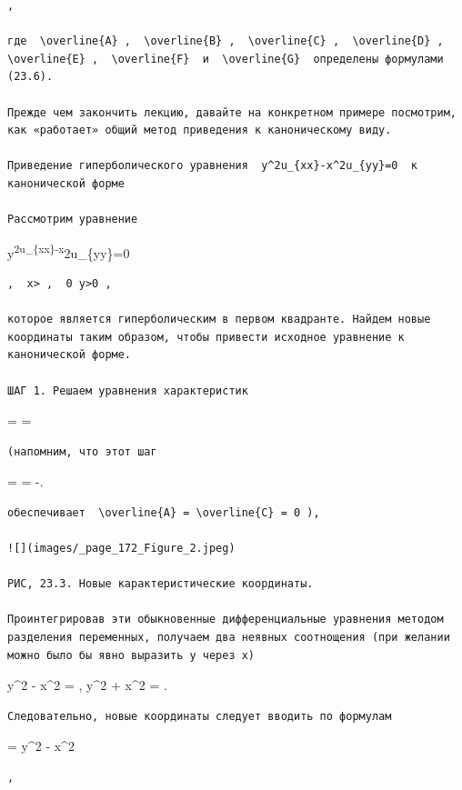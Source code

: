 \documentclass[
  ukrainian,
]{article}
\begin{document}
\begin{verbatim}
,

где  \overline{A} ,  \overline{B} ,  \overline{C} ,  \overline{D} ,  \overline{E} ,  \overline{F}  и  \overline{G}  определены формулами (23.6).

Прежде чем закончить лекцию, давайте на конкретном примере посмотрим, как «работает» общий метод приведения к каноническому виду.

Приведение гиперболического уравнения  y^2u_{xx}-x^2u_{yy}=0  к канонической форме

Рассмотрим уравнение
\end{verbatim}

y\textsuperscript{2u\_\{xx\}-x}2u\_\{yy\}=0

\begin{verbatim}
,  x> ,  0 y>0 ,

которое является гиперболическим в первом квадранте. Найдем новые координаты таким образом, чтобы привести исходное уравнение к канонической форме.

ШАГ 1. Решаем уравнения характеристик
\end{verbatim}

 =  = 

\begin{verbatim}
(напомним, что этот шаг
\end{verbatim}

 =  = -.

\begin{verbatim}
обеспечивает  \overline{A} = \overline{C} = 0 ),

![](images/_page_172_Figure_2.jpeg)

РИС, 23.3. Новые карактеристические координаты.

Проинтегрировав эти обыкновенные дифференциальные уравнения методом разделения переменных, получаем два неявных соотнощения (при желании можно было бы явно выразить у через х)
\end{verbatim}

y\^{}2 - x\^{}2 = , y\^{}2 + x\^{}2 = .

\begin{verbatim}
Следовательно, новые координаты следует вводить по формулам
\end{verbatim}

\xi = y\^{}2 - x\^{}2

\begin{verbatim}
,
\end{verbatim}
\end{document}
